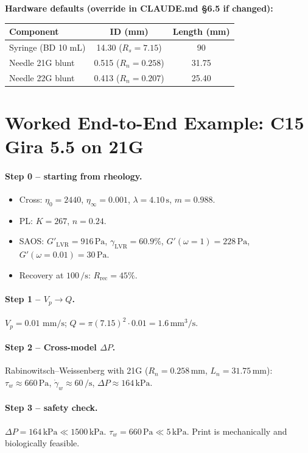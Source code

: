 \documentclass[11pt,a4paper]{article}
\newcommand{\gd}{\dot{\gamma}}
\newcommand{\mms}{\,\mathrm{mm/s}}
\begin{document}
\textbf{Hardware defaults (override in CLAUDE.md \S6.5 if changed):}
\begin{center}\small
\begin{tabular}{lcc}
\toprule
Component & ID (mm) & Length (mm) \\
\midrule
Syringe (BD 10 mL) & 14.30 ($R_s=7.15$) & 90 \\
Needle 21G blunt & 0.515 ($R_n=0.258$) & 31.75 \\
Needle 22G blunt & 0.413 ($R_n=0.207$) & 25.40 \\
\bottomrule
\end{tabular}
\end{center}

\section{Worked End-to-End Example: C15 Gira 5.5 on 21G}
\label{app:worked}

\paragraph{Step 0 -- starting from rheology.}
\begin{itemize}[leftmargin=1.4em,itemsep=1pt]
\item Cross: $\eta_0=2440$, $\eta_\infty=0.001$, $\lambda=4.10\,\si{\s}$,
  $m=0.988$.
\item PL: $K=267$, $n=0.24$.
\item SAOS: $G'_\mathrm{LVR}=916\,\si{\Pa}$, $\gamma_\mathrm{LVR}=60.9\%$,
  $G'(\omega=1)=228\,\si{\Pa}$, $G'(\omega=0.01)=30\,\si{\Pa}$.
\item Recovery at $100\,\si{\per\s}$: $R_\mathrm{rec}=45\%$.
\end{itemize}

\paragraph{Step 1 -- $V_p\to Q$.}
$V_p=0.01\,\mms$; $Q=\pi(7.15)^2\cdot 0.01=1.6\,\si{\mm^3/\s}$.

\paragraph{Step 2 -- Cross-model $\Delta P$.}
Rabinowitsch--Weissenberg with 21G ($R_n=0.258\,\si{\mm}$,
$L_n=31.75\,\si{\mm}$): $\tau_w\approx 660\,\si{\Pa}$,
$\gd_w\approx 60\,\si{\per\s}$, $\Delta P\approx 164\,\si{\kPa}$.

\paragraph{Step 3 -- safety check.}
$\Delta P=164\,\si{\kPa}\ll 1500\,\si{\kPa}$. $\tau_w=660\,\si{\Pa}\ll
5\,\si{\kPa}$. Print is mechanically and biologically feasible.
\end{document}
